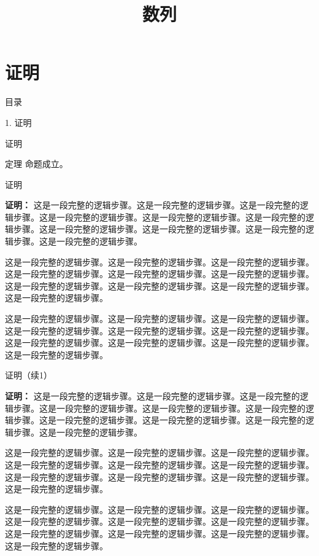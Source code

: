 \documentclass[aspectratio=169,10pt,fontset=fandol]{ctexbeamer}
\title{数列}
\begin{document}
\section{证明}
\begin{frame}[t,fragile]{目录}
\normalsize
{\color{blue}\normalsize 1. 证明\par}\vspace{0.22em}
\end{frame}
\begin{frame}[t,fragile]{证明}
\footnotesize
\begin{block}{定理}
{\footnotesize
命题成立。
}
\end{block}
\end{frame}
\begin{frame}[t,fragile]{证明}
\footnotesize
{\footnotesize
\textbf{证明：}
这是一段完整的逻辑步骤。这是一段完整的逻辑步骤。这是一段完整的逻辑步骤。这是一段完整的逻辑步骤。这是一段完整的逻辑步骤。这是一段完整的逻辑步骤。这是一段完整的逻辑步骤。这是一段完整的逻辑步骤。这是一段完整的逻辑步骤。这是一段完整的逻辑步骤。

这是一段完整的逻辑步骤。这是一段完整的逻辑步骤。这是一段完整的逻辑步骤。这是一段完整的逻辑步骤。这是一段完整的逻辑步骤。这是一段完整的逻辑步骤。这是一段完整的逻辑步骤。这是一段完整的逻辑步骤。这是一段完整的逻辑步骤。这是一段完整的逻辑步骤。

这是一段完整的逻辑步骤。这是一段完整的逻辑步骤。这是一段完整的逻辑步骤。这是一段完整的逻辑步骤。这是一段完整的逻辑步骤。这是一段完整的逻辑步骤。这是一段完整的逻辑步骤。这是一段完整的逻辑步骤。这是一段完整的逻辑步骤。这是一段完整的逻辑步骤。


}
\end{frame}
\begin{frame}[t,fragile]{证明（续1）}
\footnotesize
{\footnotesize
\textbf{证明：}
这是一段完整的逻辑步骤。这是一段完整的逻辑步骤。这是一段完整的逻辑步骤。这是一段完整的逻辑步骤。这是一段完整的逻辑步骤。这是一段完整的逻辑步骤。这是一段完整的逻辑步骤。这是一段完整的逻辑步骤。这是一段完整的逻辑步骤。这是一段完整的逻辑步骤。

这是一段完整的逻辑步骤。这是一段完整的逻辑步骤。这是一段完整的逻辑步骤。这是一段完整的逻辑步骤。这是一段完整的逻辑步骤。这是一段完整的逻辑步骤。这是一段完整的逻辑步骤。这是一段完整的逻辑步骤。这是一段完整的逻辑步骤。这是一段完整的逻辑步骤。

这是一段完整的逻辑步骤。这是一段完整的逻辑步骤。这是一段完整的逻辑步骤。这是一段完整的逻辑步骤。这是一段完整的逻辑步骤。这是一段完整的逻辑步骤。这是一段完整的逻辑步骤。这是一段完整的逻辑步骤。这是一段完整的逻辑步骤。这是一段完整的逻辑步骤。


}
\end{frame}
\end{document}

